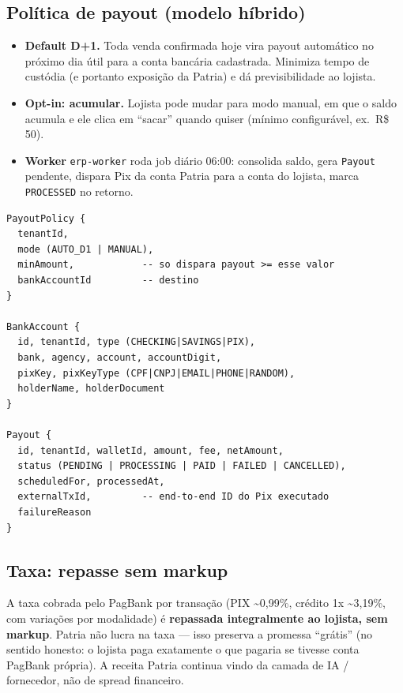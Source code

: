 \documentclass[11pt,a4paper]{article}
\begin{document}
\subsection{Política de payout (modelo híbrido)}

\begin{itemize}[leftmargin=2em]
  \item \textbf{Default D+1.} Toda venda confirmada hoje vira payout
        automático no próximo dia útil para a conta bancária cadastrada.
        Minimiza tempo de custódia (e portanto exposição da Patria) e dá
        previsibilidade ao lojista.
  \item \textbf{Opt-in: acumular.} Lojista pode mudar para modo manual,
        em que o saldo acumula e ele clica em ``sacar'' quando quiser
        (mínimo configurável, ex.\ R\$\,50).
  \item \textbf{Worker} \texttt{erp-worker} roda job diário 06:00:
        consolida saldo, gera \texttt{Payout} pendente, dispara Pix da
        conta Patria para a conta do lojista, marca \texttt{PROCESSED} no
        retorno.
\end{itemize}

\begin{lstlisting}
PayoutPolicy {
  tenantId,
  mode (AUTO_D1 | MANUAL),
  minAmount,            -- so dispara payout >= esse valor
  bankAccountId         -- destino
}

BankAccount {
  id, tenantId, type (CHECKING|SAVINGS|PIX),
  bank, agency, account, accountDigit,
  pixKey, pixKeyType (CPF|CNPJ|EMAIL|PHONE|RANDOM),
  holderName, holderDocument
}

Payout {
  id, tenantId, walletId, amount, fee, netAmount,
  status (PENDING | PROCESSING | PAID | FAILED | CANCELLED),
  scheduledFor, processedAt,
  externalTxId,         -- end-to-end ID do Pix executado
  failureReason
}
\end{lstlisting}

\subsection{Taxa: repasse sem markup}

A taxa cobrada pelo PagBank por transação (PIX \textasciitilde 0{,}99\%,
crédito 1x \textasciitilde 3{,}19\%, com variações por modalidade) é
\textbf{repassada integralmente ao lojista, sem markup}. Patria não lucra
na taxa --- isso preserva a promessa ``grátis'' (no sentido honesto: o
lojista paga exatamente o que pagaria se tivesse conta PagBank própria).
A receita Patria continua vindo da camada de IA / fornecedor, não de
spread financeiro.
\end{document}
